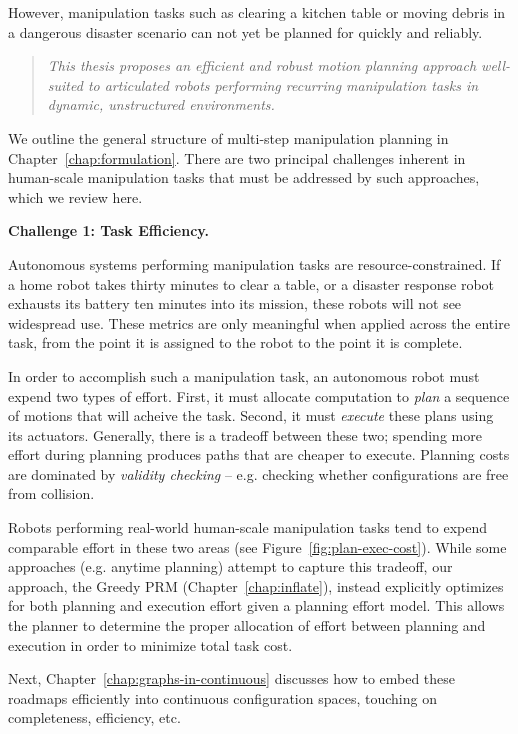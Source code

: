 \documentclass{report}
\begin{document}
However,
manipulation tasks such as clearing a kitchen table
or moving debris in a dangerous disaster scenario
can not yet be planned for quickly and reliably.
\begin{quote}
\emph{%
This thesis proposes an
efficient and robust motion planning approach
well-suited
to articulated robots
performing recurring manipulation tasks
in dynamic, unstructured environments.
}
\end{quote}

We outline the general structure of multi-step manipulation planning
in Chapter~\ref{chap:formulation}.
There are two principal challenges inherent in
human-scale manipulation tasks
that must be addressed by such approaches,
which we review here.

\textbf{Challenge 1: Task Efficiency.}

Autonomous systems performing manipulation tasks are
resource-constrained.
If a home robot takes thirty minutes to clear a table,
or a disaster response robot exhausts its battery ten minutes
into its mission,
these robots will not see widespread use.
These metrics are only meaningful
when applied across the entire task,
from the point it is assigned to the robot
to the point it is complete.

In order to accomplish such a manipulation task,
an autonomous robot must expend two types of effort.
First, it must allocate computation to \emph{plan}
a sequence of motions that will acheive the task.
Second, it must \emph{execute} these plans using its actuators.
Generally, there is a tradeoff between these two;
spending more effort during planning produces paths that are
cheaper to execute.
Planning costs are dominated by \emph{validity checking} --
e.g. checking whether configurations are free from collision.

Robots performing real-world human-scale manipulation tasks
tend to expend comparable effort in these two areas
(see Figure~\ref{fig:plan-exec-cost}).
While some approaches (e.g. anytime planning) attempt to capture
this tradeoff,
our approach,
the Greedy PRM (Chapter~\ref{chap:inflate}),
instead explicitly optimizes for both planning
and execution effort
given a planning effort model.
This allows the planner to determine the proper allocation of effort
between planning and execution in order to minimize total task cost.

Next, Chapter~\ref{chap:graphs-in-continuous}
discusses how to embed these roadmaps efficiently
into continuous configuration spaces,
touching on completeness,
efficiency, etc.
\end{document}
